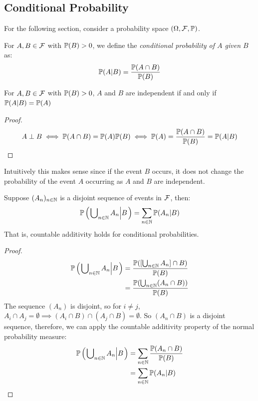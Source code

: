 \documentclass[../main.tex]{subfiles}
\begin{document}
\subsection{Conditional Probability}
For the following section, consider a probability space $(\Omega, \salg, \P)$.
\begin{definition}
  For $A, B \in \salg$ with $\P(B) > 0$, we define the \textit{conditional probability of $A$ given $B$} as:
  \[
    \P(A \vert B) = \frac{\P(A \cap B)}{\P(B)}
  \]
\end{definition}
\begin{lemma}
  For $A, B \in \salg$ with $\P(B) > 0$, $A$ and $B$ are independent if and only if $\P(A \vert B) = \P(A)$
\end{lemma}
\begin{proof}
\[
  A \perp B \iff \P(A \cap B) = \P(A)\P(B) \iff \P(A) = \frac{\P(A \cap B)}{\P(B)} = \P(A \vert B)
\]
\end{proof}
Intuitively this makes sense since if the event $B$ occurs, it does not change the probability of the event $A$ occurring as $A$ and $B$ are independent.
\begin{proposition}
  Suppose $(A_n)_{n \in \N}$ is a disjoint sequence of events in $\salg$, then:
  \label{conditionalAdditivity}
  \[
    \P\left(\left. \bigcup\nolimits_{n \in \N} A_n \middle\vert B \right.\right) = \sum_{n \in \N} \P(A_n \vert B)
  \]
  That is, countable additivity holds for conditional probabilities.
\end{proposition}
\begin{proof}
  \begin{align*}
    \P\left(\left. \bigcup\nolimits_{n \in \N} A_n \middle\vert B \right.\right) &= \frac{\P([\bigcup_{n \in \N} A_n] \cap B)}{\P(B)} \\
                                                                                 &= \frac{\P(\bigcup_{n \in \N} (A_n \cap B))}{\P(B)}
  \end{align*}
  The sequence $(A_n)$ is disjoint, so for $i \neq j$, $A_i \cap A_j = \emptyset \implies (A_i \cap B) \cap (A_j \cap B) = \emptyset$.
  So $(A_n \cap B)$ is a disjoint sequence, therefore, we can apply the countable additivity property of the normal probability measure:
  \begin{align*}
    \P\left(\left. \bigcup\nolimits_{n \in \N} A_n \middle\vert B \right.\right) &= \sum_{n \in \N} \frac{\P(A_n \cap B)}{\P(B)} \\
                                                                                 &= \sum_{n \in \N} \P(A_n \vert B)
  \end{align*}
\end{proof}
\end{document}
